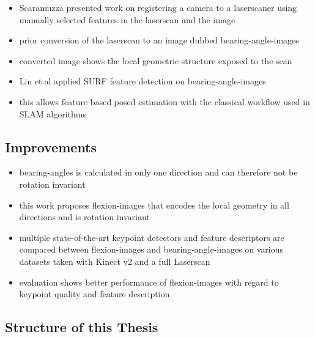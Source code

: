 \begin{itemize}
    \item Scaramuzza\cite{Scaramuzza2007} presented work on registering a camera to a laserscaner using manually selected features in the laserscan and the image
    \item prior conversion of the laserscan to an image dubbed \Glspl{bearing-angle-image}
    \item converted image shows the local geometric structure exposed to the scan

    \item Lin et.al\cite{Lin2017} applied SURF feature detection on \Glspl{bearing-angle-image}
    \item this allows feature based posed estimation with the classical workflow used in SLAM algorithms
\end{itemize}

\subsection{Improvements}

\begin{itemize}
    \item \Glspl{bearing-angle} is calculated in only one direction and can therefore not be rotation invariant
    \item this work proposes \Glspl{flexion-image} that encodes the local geometry in all directions and is rotation invariant
    \item multiple state-of-the-art keypoint detectors and feature descriptors are compared between \Glspl{flexion-image} and \Glspl{bearing-angle-image} on various datasets taken with Kinect v2 and a full Laserscan
    \item evaluation shows better performance of \Glspl{flexion-image} with regard to keypoint quality and feature description
\end{itemize}

\subsection{Structure of this Thesis}

